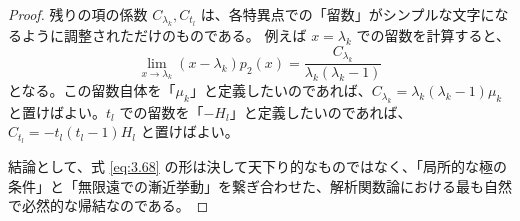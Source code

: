 \begin{Q}
\begin{proof}
残りの項の係数 $C_{\lambda_k}, C_{t_l}$ は、各特異点での「留数」がシンプルな文字になるように調整されただけのものである。
例えば $x=\lambda_k$ での留数を計算すると、
\begin{equation*}
\lim_{x \to \lambda_k} (x-\lambda_k) p_2(x) = \frac{C_{\lambda_k}}{\lambda_k(\lambda_k-1)}
\end{equation*}
となる。この留数自体を「$\mu_k$」と定義したいのであれば、$C_{\lambda_k} = \lambda_k(\lambda_k-1)\mu_k$ と置けばよい。$t_l$ での留数を「$-H_l$」と定義したいのであれば、$C_{t_l} = -t_l(t_l-1)H_l$ と置けばよい。

結論として、式 \eqref{eq:3.68} の形は決して天下り的なものではなく、「局所的な極の条件」と「無限遠での漸近挙動」を繋ぎ合わせた、解析関数論における最も自然で必然的な帰結なのである。
\end{proof}
\end{Q}

